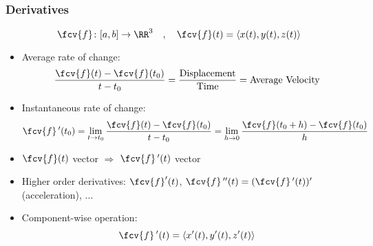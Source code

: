\begin{frame}
  \frametitle{Derivatives}
  $$\fcv{f}\colon [a,b]\to \RR^3\quad , \quad \fcv{f}(t) = \langle x(t), y(t), z(t)\rangle$$
 \begin{itemize}
   \item  Average rate of change:
  $$\frac{\fcv{f}(t)-\fcv{f}(t_0)}{t-t_0} = \frac{\text{Displacement}}{\text{Time}} =
  \text{Average Velocity}$$
  \item Instantaneous rate of change:
  $$\fcv{f}\,'(t_0) = \lim_{t\to t_0} \frac{\fcv{f}(t)-\fcv{f}(t_0)}{t-t_0} =
  \lim_{h\to 0}\frac{\fcv{f}(t_0+h)-\fcv{f}(t_0)}{h}$$
  \item $\fcv{f}(t)$ vector $\Longrightarrow$ $\fcv{f}\,'(t)$ vector
  \item Higher order derivatives: $\fcv{f}'(t)$, $\fcv{f}\,''(t) = (\fcv{f}\,'(t))'$ (acceleration), ...
  \item Component-wise operation:
  $$\fcv{f}\,'(t) = \langle x'(t), y'(t), z'(t)\rangle$$
 \end{itemize}

\end{frame}